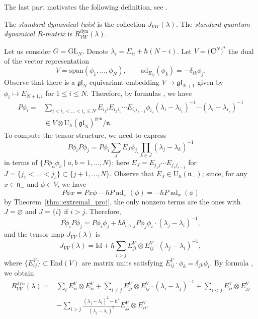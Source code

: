 \documentclass[10pt,a4paper]{article}
\numberwithin{equation}{section}
\newcommand{\C}{\mathbf{C}}
\newcommand{\U}{\mathrm{U}_{\hbar}}
\newcommand{\GL}{\mathrm{GL}}
\newcommand{\n}{\mathfrak{n}}
\DeclareMathOperator{\ad}{ad}
\newcommand{\dyn}{\mathrm{dyn}}
\newcommand{\End}{\mathrm{End}}
\newcommand{\gen}{\mathrm{gen}}
\newcommand{\gl}{\mathfrak{gl}}
\begin{document}
	The last part motivates the following definition, see \cite{EtingofVarchenkoExchange}.
	\begin{Definition}
		\label{def::standard_dyn_twist}
		The \emph{standard dynamical twist} is the collection $J_{VW}(\lambda)$. The \emph{standard quantum dynamical $R$-matrix} is $R^{\dyn}_{VW}(\lambda)$.
	\end{Definition}
	
	\begin{Example}
		\label{ex:vector_rep_dynamical}
		Let us consider $G= \GL_N$. Denote $\lambda_i = E_{ii} + \hbar (N-i)$. Let $V= \bigl(\C^N\bigr)^*$ the dual of the vector representation
		\[
		V = \mathrm{span}(\phi_1,\dots,\phi_N), \qquad \mathrm{ad}_{E_{ij}}(\phi_k) = -\delta_{ik} \phi_j.
		\]
		Observe that there is a $\gl_N$-equivariant embedding $V \rightarrow \gl_{N+1}$ given by $\phi_i \mapsto E_{N+1,i}$ for $1\leq i \leq N$. Therefore, by formulas \cite[equations~(3.2) and (3.3)]{MolevTransvectorAlgebras}, we have
		\begin{align}
			\label{eq::n_invariant_vectors}
			P \phi_i={}& \sum\limits_{i < i_1 < \dots < i_s \leq N} E_{i_1 i} E_{i_2 i_1} \cdots E_{i_s i_{s-1}} \phi_{i_s} (\lambda_i - \lambda_{i_1})^{-1} \cdots (\lambda_i - \lambda_{i_s})^{-1}\nonumber \\
&{}\in V \otimes \U(\gl_N)^{\gen} /\n.
		\end{align}
		To compute the tensor structure, we need to express
		\[
		P \phi_i P \phi_j = P\phi_i \sum\limits_J E_J \phi_{j_s} \prod_{k\in J} (\lambda_j - \lambda_k)^{-1}
		\]
		in terms of $\{P\phi_a \phi_b \mid a,b=1,\dots, N\}$; here $E_J = E_{j_1 j} \cdots E_{j_s j_{s-1}}$ for $J = \{j_1 <\dots < j_s\}\subset \{j+1,\dots,N\}$. Observe that $E_J \in \U(\n_-)$; since, for any $x\in \n_-$ and $\phi\in V$, we have
		\[
		P\phi x = Px \phi - \hbar P \ad_x(\phi) = -\hbar P\ad_x(\phi)
		\]
		by Theorem~\ref{thm::extremal_proj}, the only nonzero terms are the ones with $J=\varnothing$ and $J=\{i\}$ if $i>j$. Therefore,
		\[
		P\phi_i P\phi_j = P\phi_i \phi_j + \hbar \delta_{i>j} P \phi_j \phi_i \cdot (\lambda_j - \lambda_i)^{-1},
		\]
		and the tensor map $J_{VV}(\lambda)$ is
		\[
			J_{VV}(\lambda) = \mathrm{Id} + \hbar \sum_{i>j} E^V_{ji} \otimes E^V_{ij} \cdot (\lambda_j - \lambda_i)^{-1},
		\]
		where $\bigl\{ E_{ij}^V \bigr\} \subset \End(V)$ are matrix units satisfying $E^V_{ij}\cdot \phi_k = \delta_{jk} \phi_i$. By formula \cite[equation~(36)]{EtingofVarchenkoExchange}, we obtain
		\begin{align*}
			R^{\dyn}_{VV}(\lambda) ={}& \sum\limits_i E^V_{ii} \otimes E^V_{ii} + \sum_{i\neq j} E^V_{ji} \otimes E^V_{ij} \cdot (\lambda_i - \lambda_j)^{-1} + \sum_{i <j} E^V_{ii} \otimes E^V_{jj}\\& - \sum_{i>j} \frac{(\lambda_j - \lambda_i)^2-\hbar^2}{(\lambda_j-\lambda_i)^2} E^V_{jj} \otimes E^V_{ii}.
		\end{align*}
	\end{Example}
	
\end{document}
